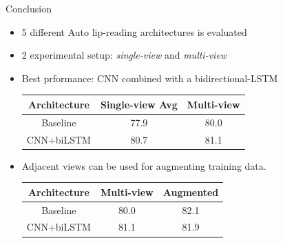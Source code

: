\documentclass[xcolor=table]{beamer}
\begin{document}

\begin{frame}{Conclusion}
    \begin{itemize}
        \item 5 different Auto lip-reading architectures is evaluated\pause
        \item 2 experimental setup: \textit{single-view} and \textit{multi-view}\pause
        \item Best prformance: CNN combined with a bidirectional-LSTM
        \begin{center}
        \begin{tabular}{c|cc}
            \rowcolor{Header}
            Architecture & Single-view Avg & Multi-view\\\hline
            Baseline & 77.9 & 80.0\\
            CNN+biLSTM & 80.7 & 81.1\\
        \end{tabular}
        \end{center}\pause
        \item Adjacent views can be used for augmenting training data.\pause
        \begin{center}
        \begin{tabular}{c|cc}
            \rowcolor{Header}
            Architecture & Multi-view & Augmented\\\hline
            Baseline & 80.0 & 82.1\\
            CNN+biLSTM & 81.1 & 81.9\\
        \end{tabular}
        \end{center}
    \end{itemize}
\end{frame}



\end{document}
